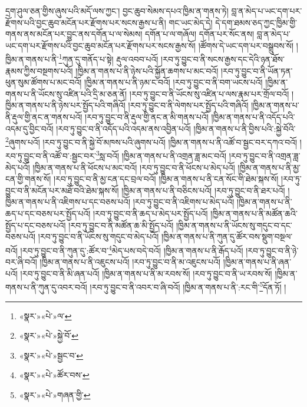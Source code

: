དྲག་ཤུལ་ཅན་གྱིས་ཞུས་པའི་མདོ་ལས་ཀྱང་། བྱང་ཆུབ་སེམས་དཔའ་ཁྱིམ་ན་གནས་ཏེ། བླ་ན་མེད་པ་ཡང་དག་པར་རྫོགས་པའི་བྱང་ཆུབ་མངོན་པར་རྫོགས་པར་སངས་རྒྱས་པ་ནི། གང་ཡང་མེད་དེ། དེ་དག་ཐམས་ཅད་ཀྱང་ཁྱིམ་གྱི་གནས་ནས་མངོན་པར་བྱུང་ནས་དགོན་པ་ལ་སེམས། དགོན་པ་ལ་གཞོལ། དགོན་པར་སོང་ནས། བླ་ན་མེད་པ་ཡང་དག་པར་རྫོགས་པའི་བྱང་ཆུབ་མངོན་པར་རྫོགས་པར་སངས་རྒྱས་སོ། །ཚོགས་དེ་ཡང་དག་པར་བསྒྲུབས་སོ། །ཁྱིམ་ན་གནས་པ་ནི་\footnote{«སྣར་»«པེ་»ལ་}ཀུན་དུ་གནོད་པ་སྟེ། རྡུལ་འབབ་པའོ། །རབ་ཏུ་བྱུང་བ་ནི་སངས་རྒྱས་དང་དེའི་ཉན་ཐོས་རྣམས་ཀྱིས་བསྔགས་པའོ། །ཁྱིམ་ན་གནས་པ་ནི་ཉེས་པའི་སྐྱོན་ཆགས་པ་མང་བའོ། །རབ་ཏུ་བྱུང་བ་ནི་ཡོན་ཏན་ཕུན་སུམ་ཚོགས་པ་མང་བའོ། །ཁྱིམ་ན་གནས་པ་ནི་ཉམ་ང་བའོ། །རབ་ཏུ་བྱུང་བ་ནི་བག་ཡངས་པའོ། །ཁྱིམ་ན་གནས་པ་ནི་ཡོངས་སུ་འཛིན་པའི་དྲི་མ་ཅན་ནོ། །རབ་ཏུ་བྱུང་བ་ནི་ཡོངས་སུ་འཛིན་པ་ལས་རྣམ་པར་གྲོལ་བའོ། །ཁྱིམ་ན་གནས་པ་ནི་ཉེས་པར་སྤྱོད་པའི་གཞིའོ། །རབ་ཏུ་བྱུང་བ་ནི་ལེགས་པར་སྤྱོད་པའི་གཞིའོ། །ཁྱིམ་ན་གནས་པ་ནི་རྡུལ་གྱི་ནང་ན་གནས་པའོ། །རབ་ཏུ་བྱུང་བ་ནི་རྡུལ་གྱི་ནང་ན་མི་གནས་པའོ། །ཁྱིམ་ན་གནས་པ་ནི་འདོད་པའི་འདམ་དུ་བྱིང་བའོ། །རབ་ཏུ་བྱུང་བ་ནི་འདོད་པའི་འདམ་ནས་འབྱིན་པའོ། །ཁྱིམ་ན་གནས་པ་ནི་བྱིས་པའི་:སྐྱེ་བོའི་\footnote{«སྣར་»«པེ་»སྐྱེ་བོ་}ཞུགས་པའོ། །རབ་ཏུ་བྱུང་བ་ནི་སྐྱེ་བོ་མཁས་པའི་ཞུགས་པའོ། །ཁྱིམ་ན་གནས་པ་ནི་འཚོ་བ་སྦྱང་བར་དཀའ་བའོ། །རབ་ཏུ་བྱུང་བ་ནི་འཚོ་བ་:སྦྱང་བར་\footnote{«སྣར་»«པེ་»སྦྱང་བ་}སླ་བའོ། །ཁྱིམ་ན་གནས་པ་ནི་འགྲན་ཟླ་མང་བའོ། །རབ་ཏུ་བྱུང་བ་ནི་འགྲན་ཟླ་མེད་པའོ། །ཁྱིམ་ན་གནས་པ་ནི་ཕོངས་པ་མང་བའོ། །རབ་ཏུ་བྱུང་བ་ནི་ཕོངས་པ་མེད་པའོ། །ཁྱིམ་ན་གནས་པ་ནི་མྱ་ངན་གྱི་གནས་སོ། །རབ་ཏུ་བྱུང་བ་ནི་མྱ་ངན་དང་བྲལ་བའོ། །ཁྱིམ་ན་གནས་པ་ནི་ངན་སོང་གི་ཐེམ་སྐས་སོ། །རབ་ཏུ་བྱུང་བ་ནི་མངོན་པར་མཐོ་བའི་ཐེམ་སྐས་སོ། །ཁྱིམ་ན་གནས་པ་ནི་བཅིངས་པའོ། །རབ་ཏུ་བྱུང་བ་ནི་ཐར་པའོ། །ཁྱིམ་ན་གནས་པ་ནི་འཇིགས་པ་དང་བཅས་པའོ། །རབ་ཏུ་བྱུང་བ་ནི་འཇིགས་པ་མེད་པའོ། །ཁྱིམ་ན་གནས་པ་ནི་ཆད་པ་དང་བཅས་པར་སྤྱོད་པའོ། །རབ་ཏུ་བྱུང་བ་ནི་ཆད་པ་མེད་པར་སྤྱོད་པའོ། །ཁྱིམ་ན་གནས་པ་ནི་མཚོན་ཆའི་སྤྱོད་པ་དང་བཅས་པའོ། །རབ་ཏུ་བྱུང་བ་ནི་མཚོན་ཆ་མི་སྤྱོད་པའོ། །ཁྱིམ་ན་གནས་པ་ནི་ཡོངས་སུ་གདུང་བ་དང་བཅས་པའོ། །རབ་ཏུ་བྱུང་བ་ནི་ཡོངས་སུ་གདུང་བ་མེད་པའོ། །ཁྱིམ་ན་གནས་པ་ནི་ཀུན་དུ་ཚོར་བས་སྡུག་བསྔལ་བའོ། །རབ་ཏུ་བྱུང་བ་ནི་ཀུན་དུ་:ཚོར་བ་\footnote{«སྣར་»«པེ་»ཚོར་བས་}མེད་པས་བདེ་བའོ། །ཁྱིམ་ན་གནས་པ་ནི་རྒོད་པའོ། །རབ་ཏུ་བྱུང་བ་ནི་ཉེ་བར་ཞི་བའོ། །ཁྱིམ་ན་གནས་པ་ནི་འཇུངས་པའོ། །རབ་ཏུ་བྱུང་བ་ནི་མ་འཇུངས་པའོ། །ཁྱིམ་ན་གནས་པ་ནི་ཞན་པའོ། །རབ་ཏུ་བྱུང་བ་ནི་མི་ཞན་པའོ། །ཁྱིམ་ན་གནས་པ་ནི་མ་རབས་སོ། །རབ་ཏུ་བྱུང་བ་ནི་ཡ་རབས་སོ། །ཁྱིམ་ན་གནས་པ་ནི་ཀུན་དུ་འབར་བའོ། །རབ་ཏུ་བྱུང་བ་ནི་འབར་བ་ཞི་བའོ། །ཁྱིམ་ན་གནས་པ་ནི་:རང་གི་\footnote{«སྣར་»«པེ་»གཞན་གྱི་}དོན་ཏོ། །
